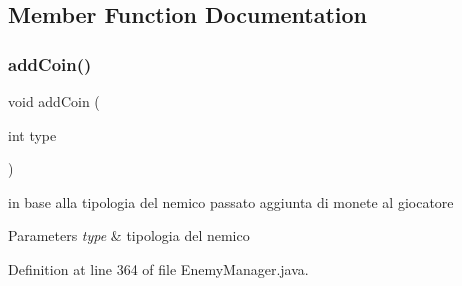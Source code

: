 \subsection{Member Function Documentation}
\mbox{\label{classmanagers_1_1_enemy_manager_a9f0f7dc28e596d2ebcd06e27ef05d9fd}} 
\subsubsection{\texorpdfstring{add\+Coin()}{addCoin()}}
{\footnotesize\ttfamily void add\+Coin (\begin{DoxyParamCaption}\item[{int}]{type }\end{DoxyParamCaption})}



in base alla tipologia del nemico passato aggiunta di monete al giocatore 


\begin{DoxyParams}{Parameters}
{\em type} & tipologia del nemico \\
\hline
\end{DoxyParams}


Definition at line 364 of file Enemy\+Manager.\+java.

